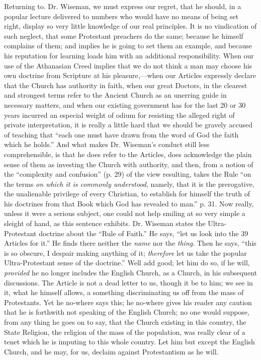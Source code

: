Returning
to. Dr. Wiseman, we must express our regret, that he should, in a
popular lecture delivered to numbers who would have no means of being
set right, display so very little knowledge of our real principles. It
is no vindication of such neglect, that some Protestant preachers do the
same; because he himself complains of them; and implies he is going to
set them an example, and because his reputation for learning loads him
with an additional responsibility. When our use of the Athanasian Creed
implies that we do not think a man may choose his own doctrine from
Scripture at his pleasure,—when our Articles expressly declare that
the Church has authority in faith, when our great Doctors, in the
clearest and strongest terms refer to the Ancient Church as an unerring
guide in necessary matters, and when our existing government has for the
last 20 or 30 years incurred
an especial weight of odium for resisting the alleged right of private
interpretation, it is really a little hard that we should be gravely
accused of teaching that ``each one must have drawn from the word of
God the faith which he holds.'' And what makes Dr. Wiseman's conduct
still less comprehensible, is that he does refer to the Articles, does
acknowledge the plain sense of them as investing the Church with
authority, and then, from a notion of the ``complexity and confusion''
(p. 29) of the view resulting, takes the Rule ``on the terms \emph{on
which it is commonly understood}, namely, that it is the prerogative,
the unalienable privilege of every Christian, to establish for himself
the truth of his doctrines from that Book which God has revealed to
man.'' p. 31. Now really, unless it were a serious subject, one could
not help smiling at so very simple a sleight of hand, as this sentence
exhibits. Dr. Wiseman states the Ultra-Protestant doctrine about the ``Rule of Faith.'' He says,
``let us look into the 39 Articles for
it.'' He finds there neither the \emph{name} nor the \emph{thing}. Then
he says, ``this is so obscure, I despair making anything of it; \emph{therefore}
let us take the popular Ultra-Protestant sense of the doctrine.'' Well
add good; let him do so, if he will, \emph{provided} he no longer
includes the English Church, as a Church, in his subsequent discussions.
The Article is not a dead letter to us, though it be to him; we see in
it, what he himself allows, a something discriminating us off from the
mass of Protestants. Yet he no-where says this; he no-where gives his
reader any caution that he is forthwith not speaking of the English
Church; no one would suppose, from any thing he goes on to say, that the
Church existing in this country, the State Religion, the religion of the
mass of the population, was really clear of a tenet which he is imputing
to this whole country. Let him but except the English Church, and he
may, for us, declaim against Protestantism as he will.

